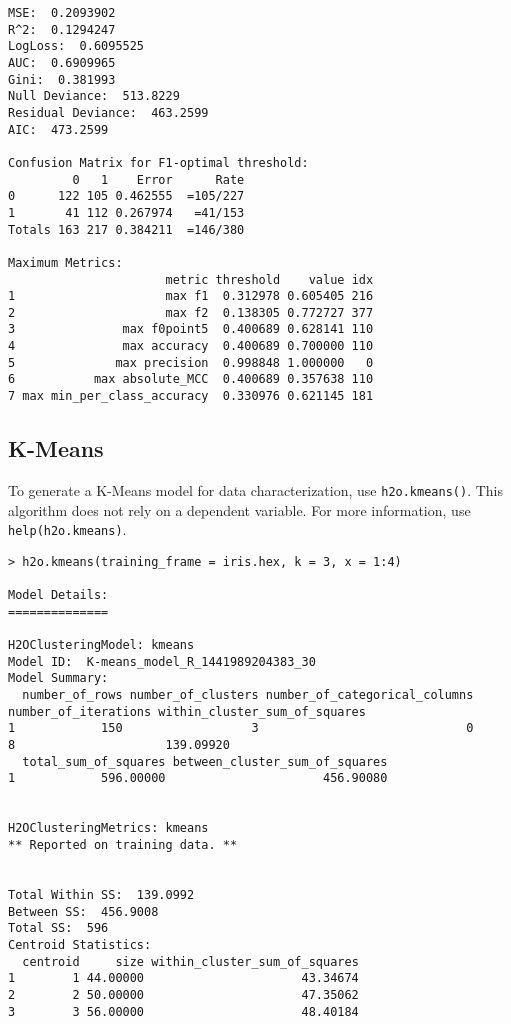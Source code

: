 {\begin{lstlisting}[style=R]
MSE:  0.2093902
R^2:  0.1294247
LogLoss:  0.6095525
AUC:  0.6909965
Gini:  0.381993
Null Deviance:  513.8229
Residual Deviance:  463.2599
AIC:  473.2599

Confusion Matrix for F1-optimal threshold:
         0   1    Error      Rate
0      122 105 0.462555  =105/227
1       41 112 0.267974   =41/153
Totals 163 217 0.384211  =146/380

Maximum Metrics:
                      metric threshold    value idx
1                     max f1  0.312978 0.605405 216
2                     max f2  0.138305 0.772727 377
3               max f0point5  0.400689 0.628141 110
4               max accuracy  0.400689 0.700000 110
5              max precision  0.998848 1.000000   0
6           max absolute_MCC  0.400689 0.357638 110
7 max min_per_class_accuracy  0.330976 0.621145 181

\end{lstlisting}

\subsection{K-Means}

To generate a K-Means model for data characterization, use {\texttt{h2o.kmeans()}}. This algorithm does not rely on a dependent variable. For more information, use {\texttt{help(h2o.kmeans)}}.
\smallskip
\begin{lstlisting}[style=R]
> h2o.kmeans(training_frame = iris.hex, k = 3, x = 1:4)

Model Details:
==============

H2OClusteringModel: kmeans
Model ID:  K-means_model_R_1441989204383_30 
Model Summary:
  number_of_rows number_of_clusters number_of_categorical_columns number_of_iterations within_cluster_sum_of_squares
1            150                  3                             0                    8                     139.09920
  total_sum_of_squares between_cluster_sum_of_squares
1            596.00000                      456.90080


H2OClusteringMetrics: kmeans
** Reported on training data. **


Total Within SS:  139.0992
Between SS:  456.9008
Total SS:  596 
Centroid Statistics:
  centroid     size within_cluster_sum_of_squares
1        1 44.00000                      43.34674
2        2 50.00000                      47.35062
3        3 56.00000                      48.40184
\end{lstlisting}

}
